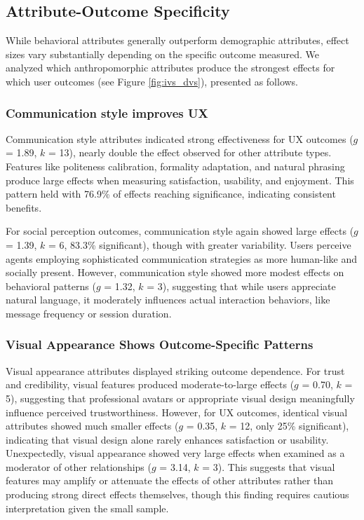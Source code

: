 \documentclass[manuscript,anonymous,sigconf]{acmart}
\begin{document}
\subsection{Attribute-Outcome Specificity}

While behavioral attributes generally outperform demographic attributes, effect sizes vary substantially depending on the specific outcome measured. We analyzed which anthropomorphic attributes produce the strongest effects for which user outcomes (see Figure \ref{fig:ivs_dvs}), presented as follows. %

\subsubsection{Communication style improves UX}\label{sec:comm}

Communication style attributes indicated strong effectiveness for UX outcomes ($g$ = 1.89, $k$ = 13), nearly double the effect observed for other attribute types. Features like politeness calibration, formality adaptation, and natural phrasing produce large effects when measuring satisfaction, usability, and enjoyment. This pattern held with 76.9\% of effects reaching significance, indicating consistent benefits.

For social perception outcomes, communication style again showed large effects ($g$ = 1.39, $k$ = 6, 83.3\% significant), though with greater variability. Users perceive agents employing sophisticated communication strategies as more human-like and socially present. However, communication style showed more modest effects on behavioral patterns ($g$ = 1.32, $k$ = 3), suggesting that while users appreciate natural language, it moderately influences actual interaction behaviors, like message frequency or session duration.

\subsubsection{Visual Appearance Shows Outcome-Specific Patterns}

Visual appearance attributes displayed striking outcome dependence. For trust and credibility, visual features produced moderate-to-large effects ($g$ = 0.70, $k$ = 5), suggesting that professional avatars or appropriate visual design meaningfully influence perceived trustworthiness. However, for UX outcomes, identical visual attributes showed much smaller effects ($g$ = 0.35, $k$ = 12, only 25\% significant), indicating that visual design alone rarely enhances satisfaction or usability.
Unexpectedly, visual appearance showed very large effects when examined as a moderator of other relationships ($g$ = 3.14, $k$ = 3). This suggests that visual features may amplify or attenuate the effects of other attributes rather than producing strong direct effects themselves, though this finding requires cautious interpretation given the small sample.
\end{document}
